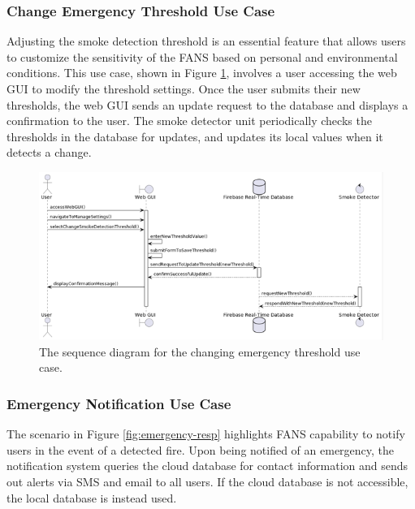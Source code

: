 \subsubsection{Change Emergency Threshold Use Case}

Adjusting the smoke detection threshold is an essential feature that allows users to customize the sensitivity of the
FANS based on personal and environmental conditions. This use case, shown in Figure \ref{fig:change-thresh}, involves a
user accessing the web GUI to modify the threshold settings. Once the user submits their new thresholds, the web GUI
sends an update request to the database and displays a confirmation to the user. The smoke detector unit periodically
checks the thresholds in the database for updates, and updates its local values when it detects a change.

\begin{figure}
    \centering
    \includegraphics[width=\imagewidth]{../assets/sequence/ChangingSmokeDetectionThresholdSequenceDiagram.png}
    \caption{The sequence diagram for the changing emergency threshold use case.}
    \label{fig:change-thresh}
\end{figure}

\subsubsection{Emergency Notification Use Case}

The scenario in Figure \ref{fig:emergency-resp} highlights FANS capability to notify users in the event of a detected
fire. Upon being notified of an emergency, the notification system queries the cloud database for contact information
and sends out alerts via SMS and email to all users. If the cloud database is not accessible, the local database is
instead used.

